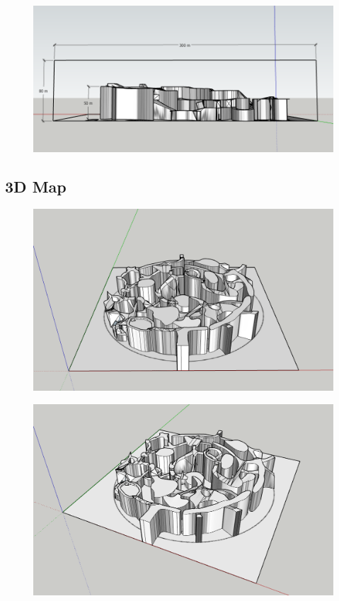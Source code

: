 \begin{figure}[H]
	\centering
	\includegraphics[width=14cm]{images/map/3D_map_half.png}
\end{figure}

\newpage

\subsection{3D Map}

\begin{figure}[H]
	\centering
	\includegraphics[width=14cm]{images/map/3D_map_001.png}
\end{figure}
\vspace*{3cm}
\begin{figure}[H]
	\centering
	\includegraphics[width=14cm]{images/map/3D_map_002.png}
\end{figure}

